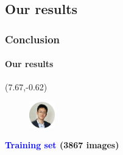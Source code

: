\subsection{Our results}
\begin{frame}
\frametitle{Conclusion}
\framesubtitle{Our results}

\begin{textblock}{15}(7.67,-0.62)
	\begin{figure}[H]
		\includegraphics[width=0.1\textwidth]{Images/Team/WeihaoZHOU.png} 
	\end{figure}
\end{textblock}

\setlength{\tabcolsep}{1pt}

\begin{adjustwidth}{-1.5em}{-1.5em}
\begin{center}

{\fontsize{7}{11}\selectfont

\textbf{\textcolor{blue}{Training set} (3867 images)}
\vspace{0.5cm}

}
\end{center}
\end{adjustwidth}
\end{frame}
